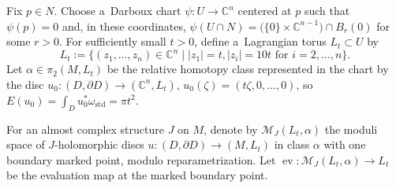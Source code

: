 \documentclass[pdftex]{sigma}
\numberwithin{equation}{section}
\newcommand{\bC}{{\mathbb C}}
\newcommand{\ev}{\operatorname{ev}}
\theoremstyle{definition}
\begin{document}
Fix $p\in N$. Choose a~Darboux chart $\psi\colon U\to \bC^{n}$ centered at $p$ such that $\psi(p)=0$ and, in these coordinates,
$
\psi(U\cap N)=\bigl(\{0\}\times \bC^{n-1}\bigr)\cap B_{r}(0)
$
for some $r>0$.
For sufficiently small $t>0$, define a~Lagrangian torus $L_t\subset U$ by
\[
L_t:=\{(z_1,\dots,z_n)\in \bC^n \mid |z_1|=t, |z_i|=10t \text{ for }i=2,\dots,n\}.
\]
Let $\alpha\in \pi_2(M,L_t)$ be the relative homotopy class represented in the chart by the disc
$
u_0\colon  (D,\partial D)\allowbreak\to (\bC^n,L_t)$, $ u_0(\zeta)=(t\zeta,0,\dots,0)$,
so $E(u_0)=\int_D u_0^*\omega_{\mathrm{std}}=\pi t^{2}$.

For an almost complex structure $J$ on $M$, denote by $\mathcal{M}_{J}(L_t,\alpha)$ the moduli space of $J$\nobreakdash-holo\-morphic discs $u\colon(D,\partial D)\to(M,L_t)$ in class $\alpha$ with one boundary marked point, modulo reparametrization. Let
$
\ev\colon \mathcal{M}_{J}(L_t,\alpha)\to L_t
$
be the evaluation map at the marked boundary point.
\end{document}
